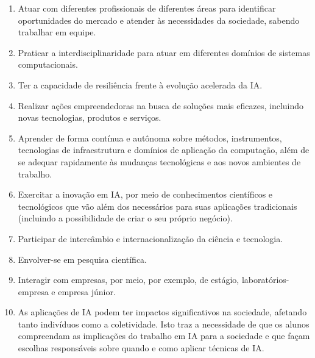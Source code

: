 \begin{enumerate}
    \item Atuar com diferentes profissionais de diferentes áreas para identificar oportunidades do mercado e atender às necessidades da sociedade, sabendo trabalhar em equipe.
    \item Praticar a interdisciplinaridade para atuar em diferentes domínios de sistemas computacionais.
    \item Ter a capacidade de resiliência frente à evolução acelerada da IA.
    \item Realizar ações empreendedoras na busca de soluções mais eficazes, incluindo novas tecnologias, produtos e serviços.
    \item Aprender de forma contínua e autônoma sobre métodos, instrumentos, tecnologias de infraestrutura e domínios de aplicação da computação, além de se adequar rapidamente às mudanças tecnológicas e aos novos ambientes de trabalho.
    \item Exercitar a inovação em IA, por meio de conhecimentos científicos e tecnológicos que vão além dos necessários para suas aplicações tradicionais  (incluindo a possibilidade de criar o seu próprio negócio).
    \item Participar de intercâmbio e internacionalização da ciência e tecnologia.
    \item Envolver-se em pesquisa científica.
    \item Interagir com empresas, por meio, por exemplo, de estágio, laboratórios-empresa e empresa júnior.
    \item As aplicações de IA podem ter impactos significativos na sociedade, afetando tanto indivíduos como a coletividade. Isto traz a necessidade de que os alunos compreendam as implicações do trabalho em IA para a sociedade e que façam escolhas responsáveis sobre quando e como aplicar técnicas de IA.
\end{enumerate}

